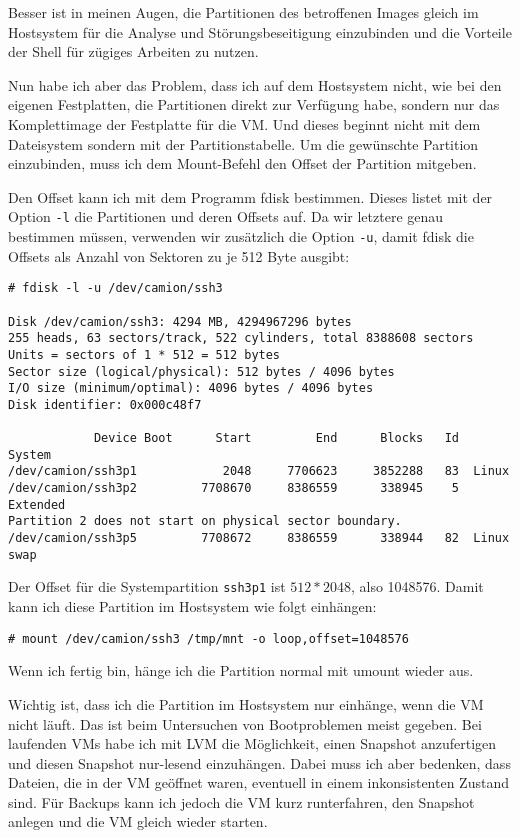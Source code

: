 Besser ist in meinen Augen, die Partitionen des betroffenen Images gleich im
Hostsystem für die Analyse und Störungsbeseitigung einzubinden und die
Vorteile der Shell für zügiges Arbeiten zu nutzen.

Nun habe ich aber das Problem, dass ich auf dem Hostsystem nicht, wie bei den
eigenen Festplatten, die Partitionen direkt zur Verfügung habe, sondern nur
das Komplettimage der Festplatte für die VM. Und dieses beginnt nicht mit dem
Dateisystem sondern mit der Partitionstabelle. Um die gewünschte Partition
einzubinden, muss ich dem Mount-Befehl den Offset der Partition mitgeben.

Den Offset kann ich mit dem Programm fdisk bestimmen. Dieses listet mit der
Option \verb?-l? die Partitionen und deren Offsets auf. Da wir letztere genau
bestimmen müssen, verwenden wir zusätzlich die Option \verb?-u?, damit fdisk
die Offsets als Anzahl von Sektoren zu je 512 Byte ausgibt:

\begin{verbatim}
# fdisk -l -u /dev/camion/ssh3 

Disk /dev/camion/ssh3: 4294 MB, 4294967296 bytes
255 heads, 63 sectors/track, 522 cylinders, total 8388608 sectors
Units = sectors of 1 * 512 = 512 bytes
Sector size (logical/physical): 512 bytes / 4096 bytes
I/O size (minimum/optimal): 4096 bytes / 4096 bytes
Disk identifier: 0x000c48f7

            Device Boot      Start         End      Blocks   Id  System
/dev/camion/ssh3p1            2048     7706623     3852288   83  Linux
/dev/camion/ssh3p2         7708670     8386559      338945    5  Extended
Partition 2 does not start on physical sector boundary.
/dev/camion/ssh3p5         7708672     8386559      338944   82  Linux swap
\end{verbatim}

Der Offset für die Systempartition \verb?ssh3p1? ist $512 * 2048$, also
1048576. Damit kann ich diese Partition im Hostsystem wie folgt einhängen:

\begin{verbatim}
# mount /dev/camion/ssh3 /tmp/mnt -o loop,offset=1048576
\end{verbatim}

Wenn ich fertig bin, hänge ich die Partition normal mit umount wieder aus.

Wichtig ist, dass ich die Partition im Hostsystem nur einhänge, wenn die VM
nicht läuft. Das ist beim Untersuchen von Bootproblemen meist gegeben. Bei
laufenden VMs habe ich mit LVM die Möglichkeit, einen Snapshot anzufertigen
und diesen Snapshot nur-lesend einzuhängen. Dabei muss ich aber bedenken, dass
Dateien, die in der VM geöffnet waren, eventuell in einem inkonsistenten
Zustand sind. Für Backups kann ich jedoch die VM kurz runterfahren, den
Snapshot anlegen und die VM gleich wieder starten.

